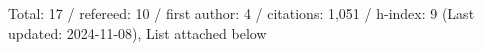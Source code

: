 Total: 17 / refereed: 10 / first author: 4 / citations: 1,051 / h-index: 9 (Last updated: 2024-11-08), List attached below